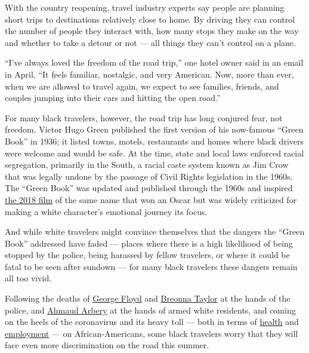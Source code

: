 With the country reopening, travel industry experts say people are
planning short trips to destinations relatively close to home. By
driving they can control the number of people they interact with, how
many stops they make on the way and whether to take a detour or not ---
all things they can't control on a plane.

``I've always loved the freedom of the road trip,'' one hotel owner said
in an email in April. ``It feels familiar, nostalgic, and very American.
Now, more than ever, when we are allowed to travel again, we expect to
see families, friends, and couples jumping into their cars and hitting
the open road.''

For many black travelers, however, the road trip has long conjured fear,
not freedom. Victor Hugo Green published the first version of his
now-famous ``Green Book'' in 1936; it listed towns, motels, restaurants
and homes where black drivers were welcome and would be safe. At the
time, state and local laws enforced racial segregation, primarily in the
South, a racial caste system known as Jim Crow that was legally undone
by the passage of Civil Rights legislation in the 1960s. The ``Green
Book'' was updated and published through the 1960s and inspired
\href{https://www.nytimes3xbfgragh.onion/2019/01/23/arts/green-book-interracial-friendship.html}{the
2018 film} of the same name that won an Oscar but was widely criticized
for making a white character's emotional journey its focus.

And while white travelers might convince themselves that the dangers the
``Green Book'' addressed have faded --- places where there is a high
likelihood of being stopped by the police, being harassed by fellow
travelers, or where it could be fatal to be seen after sundown --- for
many black travelers these dangers remain all too vivid.

Following the deaths of
\href{https://www.nytimes3xbfgragh.onion/2020/05/31/us/george-floyd-investigation.html}{George
Floyd} and
\href{https://www.nytimes3xbfgragh.onion/article/breonna-taylor-police.html}{Breonna
Taylor} at the hands of the police, and
\href{https://www.nytimes3xbfgragh.onion/article/ahmaud-arbery-shooting-georgia.html}{Ahmaud
Arbery} at the hands of armed white residents, and coming on the heels
of the coronavirus and its heavy toll --- both in terms of
\href{https://slack-redir.net/link?url=https\%3A\%2F\%2Fwww.nytimes3xbfgragh.onion\%2F2020\%2F04\%2F07\%2Fus\%2Fcoronavirus-race.html}{health}
and
\href{https://slack-redir.net/link?url=https\%3A\%2F\%2Fwww.nytimes3xbfgragh.onion\%2F2020\%2F06\%2F01\%2Fbusiness\%2Feconomy\%2Fblack-workers-inequality-economic-risks.html}{employment}
--- on African-Americans, some black travelers worry that they will face
even more discrimination on the road this summer.

